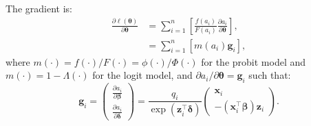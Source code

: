 The gradient is:
\begin{equation*}
\begin{aligned}
\frac{\partial \ell(\boldsymbol \theta)}{\partial \boldsymbol \theta} & = \sum_{i=1}^n\left[\frac{f(a_i)}{F(a_i)}\frac{\partial a_i}{\partial \boldsymbol \theta}\right], \\
& = \sum_{i=1}^n\left[m(a_i)\mathbf g_{i}\right],
\end{aligned}
\end{equation*}
where \(m(\cdot)=f(\cdot)/F(\cdot)=\phi(\cdot)/\Phi(\cdot)\) for the probit model and \(m(\cdot) = 1 - \Lambda(\cdot)\) for the logit model, and \(\partial a_i/\partial \boldsymbol \theta= \mathbf g_i\) such that:
\begin{equation*}
\mathbf g_{i}  = \begin{pmatrix}
                      \frac{\partial a_i}{\partial \boldsymbol \beta} \\
                      \frac{\partial a_i}{\partial \boldsymbol \delta}
                     \end{pmatrix}
                   = \frac{q_i}{\exp(\mathbf z_i^\top\boldsymbol \delta)}
                     \begin{pmatrix}
                      \mathbf x_i \\
                      -\left(\mathbf x_i^\top\boldsymbol \beta\right)\mathbf z_i
                     \end{pmatrix}.
\end{equation*}

